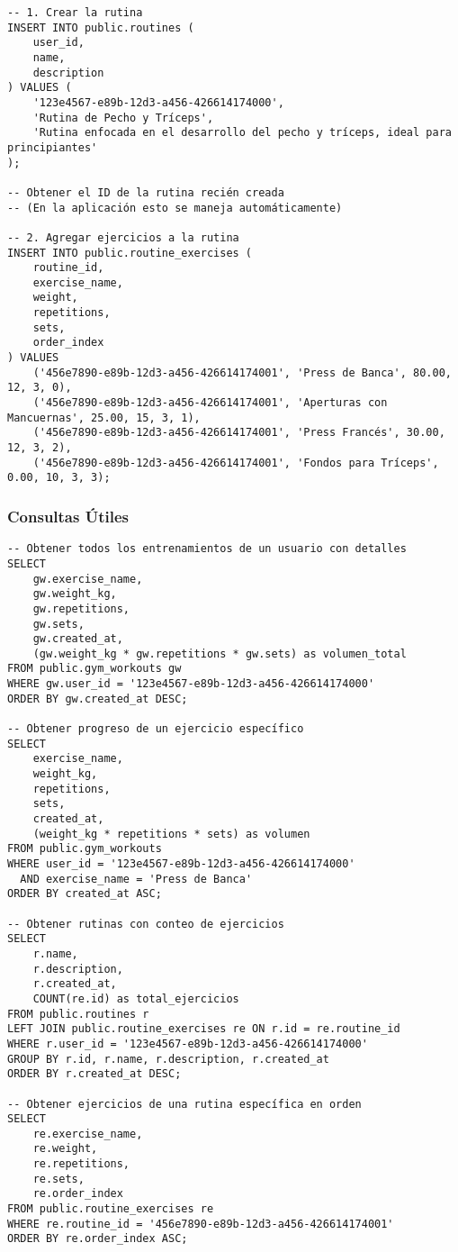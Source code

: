 \documentclass[12pt,a4paper]{article}
\begin{document}
\begin{lstlisting}[style=sqlstyle, caption=Ejemplo de creación de rutina completa]
-- 1. Crear la rutina
INSERT INTO public.routines (
    user_id,
    name,
    description
) VALUES (
    '123e4567-e89b-12d3-a456-426614174000',
    'Rutina de Pecho y Tríceps',
    'Rutina enfocada en el desarrollo del pecho y tríceps, ideal para principiantes'
);

-- Obtener el ID de la rutina recién creada
-- (En la aplicación esto se maneja automáticamente)

-- 2. Agregar ejercicios a la rutina
INSERT INTO public.routine_exercises (
    routine_id,
    exercise_name,
    weight,
    repetitions,
    sets,
    order_index
) VALUES 
    ('456e7890-e89b-12d3-a456-426614174001', 'Press de Banca', 80.00, 12, 3, 0),
    ('456e7890-e89b-12d3-a456-426614174001', 'Aperturas con Mancuernas', 25.00, 15, 3, 1),
    ('456e7890-e89b-12d3-a456-426614174001', 'Press Francés', 30.00, 12, 3, 2),
    ('456e7890-e89b-12d3-a456-426614174001', 'Fondos para Tríceps', 0.00, 10, 3, 3);
\end{lstlisting}

\subsubsection{Consultas Útiles}

\begin{lstlisting}[style=sqlstyle, caption=Consultas útiles para análisis]
-- Obtener todos los entrenamientos de un usuario con detalles
SELECT 
    gw.exercise_name,
    gw.weight_kg,
    gw.repetitions,
    gw.sets,
    gw.created_at,
    (gw.weight_kg * gw.repetitions * gw.sets) as volumen_total
FROM public.gym_workouts gw
WHERE gw.user_id = '123e4567-e89b-12d3-a456-426614174000'
ORDER BY gw.created_at DESC;

-- Obtener progreso de un ejercicio específico
SELECT 
    exercise_name,
    weight_kg,
    repetitions,
    sets,
    created_at,
    (weight_kg * repetitions * sets) as volumen
FROM public.gym_workouts
WHERE user_id = '123e4567-e89b-12d3-a456-426614174000'
  AND exercise_name = 'Press de Banca'
ORDER BY created_at ASC;

-- Obtener rutinas con conteo de ejercicios
SELECT 
    r.name,
    r.description,
    r.created_at,
    COUNT(re.id) as total_ejercicios
FROM public.routines r
LEFT JOIN public.routine_exercises re ON r.id = re.routine_id
WHERE r.user_id = '123e4567-e89b-12d3-a456-426614174000'
GROUP BY r.id, r.name, r.description, r.created_at
ORDER BY r.created_at DESC;

-- Obtener ejercicios de una rutina específica en orden
SELECT 
    re.exercise_name,
    re.weight,
    re.repetitions,
    re.sets,
    re.order_index
FROM public.routine_exercises re
WHERE re.routine_id = '456e7890-e89b-12d3-a456-426614174001'
ORDER BY re.order_index ASC;
\end{lstlisting}
\end{document}
